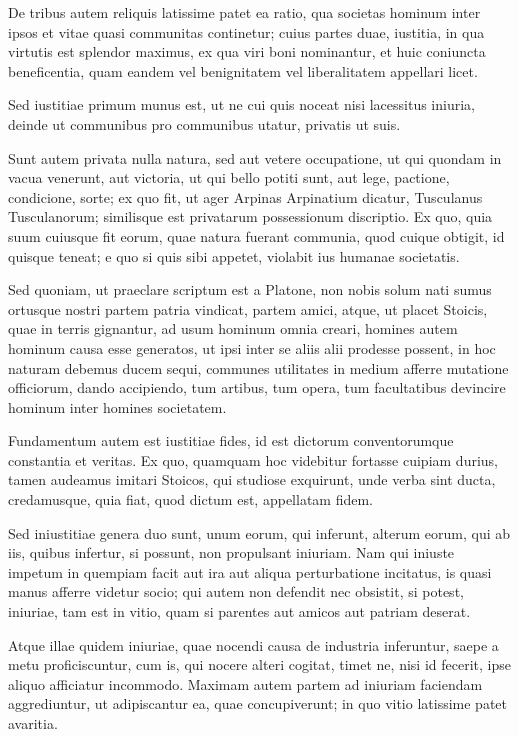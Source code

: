  De tribus autem reliquis latissime patet ea ratio, qua societas hominum inter ipsos et vitae quasi communitas continetur; cuius partes duae, iustitia, in qua virtutis est splendor maximus, ex qua viri boni nominantur, et huic coniuncta beneficentia, quam eandem vel benignitatem vel liberalitatem appellari licet.

Sed iustitiae primum munus est, ut ne cui quis noceat nisi lacessitus iniuria, deinde ut communibus pro communibus utatur, privatis ut suis.
 

 Sunt autem privata nulla natura, sed aut vetere occupatione, ut qui quondam in vacua venerunt, aut victoria, ut qui bello potiti sunt, aut lege, pactione, condicione, sorte; ex quo fit, ut ager Arpinas Arpinatium dicatur, Tusculanus Tusculanorum; similisque est privatarum possessionum discriptio. Ex quo, quia suum cuiusque fit eorum, quae natura fuerant communia, quod cuique obtigit, id quisque teneat; e quo si quis sibi appetet, violabit ius humanae societatis.
 
 Sed quoniam, ut praeclare scriptum est a Platone, non nobis solum nati sumus ortusque nostri partem patria vindicat, partem amici, atque, ut placet Stoicis, quae in terris gignantur, ad usum hominum omnia creari, homines autem hominum causa esse generatos, ut ipsi inter se aliis alii prodesse possent, in hoc naturam debemus ducem sequi, communes utilitates in medium afferre mutatione officiorum, dando accipiendo, tum artibus, tum opera, tum facultatibus devincire hominum inter homines societatem.

 Fundamentum autem est iustitiae fides, id est dictorum conventorumque constantia et veritas. Ex quo, quamquam hoc videbitur fortasse cuipiam durius, tamen audeamus imitari Stoicos, qui studiose exquirunt, unde verba sint ducta, credamusque, quia fiat, quod dictum est, appellatam fidem.

Sed iniustitiae genera duo sunt, unum eorum, qui inferunt, alterum eorum, qui ab iis, quibus infertur, si possunt, non propulsant iniuriam. Nam qui iniuste impetum in quempiam facit aut ira aut aliqua perturbatione incitatus, is quasi manus afferre videtur socio; qui autem non defendit nec obsistit, si potest, iniuriae, tam est in vitio, quam si parentes aut amicos aut patriam deserat. 

 Atque illae quidem iniuriae, quae nocendi causa de industria inferuntur, saepe a metu proficiscuntur, cum is, qui nocere alteri cogitat, timet ne, nisi id fecerit, ipse aliquo afficiatur incommodo. Maximam autem partem ad iniuriam faciendam aggrediuntur, ut adipiscantur ea, quae concupiverunt; in quo vitio latissime patet avaritia.
 

